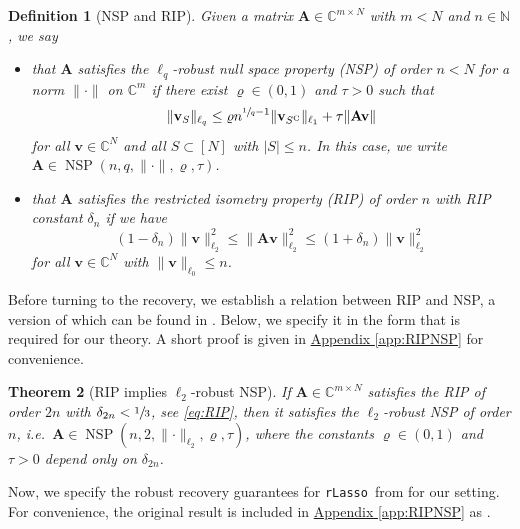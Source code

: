 \documentclass[11pt,reqno, a4paper]{article}
\numberwithin{equation}{section}
\newtheorem{theorem}{Theorem}[section]
\newtheorem{definition}[theorem]{Definition}
\newcommand{\N}{\mathbb{N}}
\newcommand{\C}{\mathbb{C}}
\newcommand{\rlasso}{\texttt{rLasso}}
\begin{document}
\begin{definition}[NSP and RIP]
Given a matrix $\mathbf{A}\in\mathbb{C}^{m\times N}$ with $m<N$ and $n\in\N$, we say
\begin{itemize}[itemsep=0pt, topsep=2pt, leftmargin=*]
    \item that $\mathbf{A}$ satisfies the $\ell_q$-robust null space property (NSP) of order $n<N$ for a norm $\lVert\cdot\rVert$ on $\mathbb{C}^m$ if there exist $\varrho\in(0,1)$ and $\tau>0$ such that
    \begin{equation}\label{eq:NSP}
        \lVert\mathbf{v}_S\rVert_{\ell_q} \leq \varrho n^{\sfrac{1}{q}-1}\lVert\mathbf{v}_{S^\mathrm{C}}\rVert_{\ell_1} + \tau \lVert{\mathbf{A}}\mathbf{v}\rVert
    \end{equation}
    for all $\mathbf{v}\in\mathbb{C}^N$ and all $S\subset[N]$ with $\lvert S\rvert\leq n$.
    In this case, we write $\mathbf{A}\in\operatorname{NSP}(n,q,\lVert\cdot\rVert,\varrho,\tau)$.
    \item that $\mathbf{A}$ satisfies the restricted isometry property (RIP) of order $n$ with RIP constant $\delta_n$ if we have
    \begin{equation}\label{eq:RIP}
        (1-\delta_{n})\lVert\mathbf{v}\rVert_{\ell_2}^2 \leq \lVert\mathbf{A}\mathbf{v}\rVert_{\ell_2}^2 \leq (1+\delta_{n})\lVert\mathbf{v}\rVert_{\ell_2}^2
    \end{equation}
    for all $\mathbf{v} \in \mathbb{C}^N$ with $\lVert\mathbf{v}\rVert_{\ell_0} \leq n$.
\end{itemize}
\end{definition}

Before turning to the recovery, we establish a relation between RIP and NSP, a version of which can be found in \cite[Thm.\ 6.26]{AdcockBrugWebster22}.
Below, we specify it in the form that is required for our theory.
A short proof is given in \hyperref[app:RIPNSP]{Appendix \ref*{app:RIPNSP}} for convenience.

\begin{theorem}[RIP implies $\ell_2$-robust NSP]\label{thm:RIP_implies_NSP}
If $\mathbf{A} \in \C^{m\times N}$ satisfies the RIP of order $2n$ with $\delta_{2n}<\sfrac{1}{3}$, see \eqref{eq:RIP}, then it satisfies the $\ell_2$-robust NSP of order $n$, i.e.\ $\mathbf{A}\in\operatorname{NSP}(n,2,\lVert\cdot\rVert_{\ell_2},\varrho,\tau)$, where the constants $\varrho \in (0,1)$ and $\tau>0$ depend only on $\delta_{2n}$.
\end{theorem}

Now, we specify the robust recovery guarantees for \rlasso \ from \cite[Thm.\ 3.1]{PeJu22} for our setting.
For convenience, the original result is included in \hyperref[app:RIPNSP]{Appendix \ref*{app:RIPNSP}} as .
\end{document}
